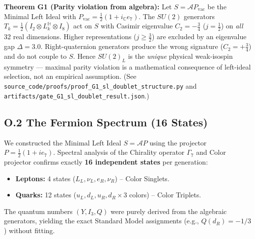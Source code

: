 \textbf{Theorem G1 (Parity violation from algebra):} Let $S = \mathcal{A}P_\mathrm{vac}$ be the Minimal Left Ideal with $P_\mathrm{vac} = \tfrac{1}{2}(1 + i_\mathbb{C} e_7)$. The $SU(2)$ generators $T_k = \tfrac{1}{2}(I_2 \otimes L_k^{\mathbb{H}} \otimes I_8)$ act on $S$ with Casimir eigenvalue $C_2 = -\tfrac{3}{4}$ ($j = \tfrac{1}{2}$) on \emph{all} 32 real dimensions. Higher representations ($j \geq \tfrac{3}{2}$) are excluded by an eigenvalue gap $\Delta = 3.0$. Right-quaternion generators produce the wrong signature ($C_2 = +\tfrac{3}{4}$) and do not couple to $S$. Hence $SU(2)_L$ is the \emph{unique} physical weak-isospin symmetry — maximal parity violation is a mathematical consequence of left-ideal selection, not an empirical assumption. (See \texttt{source\_\allowbreak code/\allowbreak proofs/\allowbreak proof\_\allowbreak G1\_\allowbreak sl\_\allowbreak doublet\_\allowbreak structure.py} and \texttt{artifacts/\allowbreak gate\_\allowbreak G1\_\allowbreak sl\_\allowbreak doublet\_\allowbreak result.json}.)

\subsection{O.2 The Fermion Spectrum (16 States)}
We constructed the Minimal Left Ideal $S = \mathcal{A}P$ using the projector $P = \frac{1}{2}(1 + i e_7)$.
Spectral analysis of the Chirality operator $\Gamma_7$ and Color projector confirms exactly \textbf{16 independent states} per generation:
\begin{itemize}
    \item \textbf{Leptons:} 4 states ($L_L, \nu_L, e_R, \nu_R$) -- Color Singlets.
    \item \textbf{Quarks:} 12 states ($u_L, d_L, u_R, d_R \times 3$ colors) -- Color Triplets.
\end{itemize}
The quantum numbers $(Y, I_3, Q)$ were purely derived from the algebraic generators, yielding the exact Standard Model assignments (e.g., $Q(d_R) = -1/3$) without fitting.

